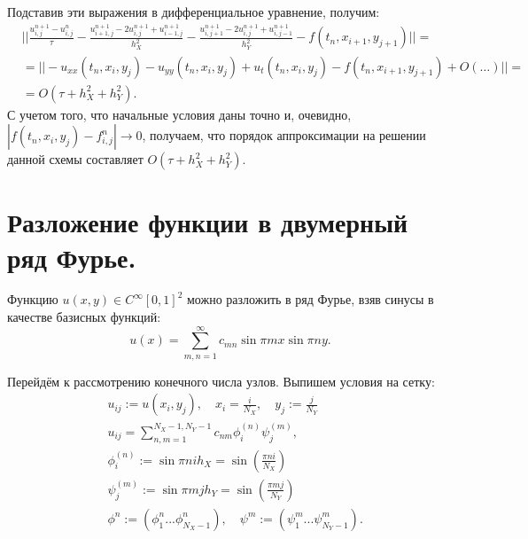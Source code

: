 \documentclass[14pt,a4paper]{extarticle}
\newcommand{\1}{\mathbbm{1}}
\begin{document}
Подставив эти выражения в дифференциальное уравнение, получим:
\begin{align*}
    &||\frac{u_{i, j}^{n+1} - u_{i, j}^n}{\tau} - \frac{u_{i+1, j}^{n+1} - 2 u_{i, j}^{n+1} + u_{i-1, j}^{n+1}}{h_X^2} - 
    \frac{u_{i, j+1}^{n+1} - 2 u_{i, j}^{n+1} + u_{i, j-1}^{n+1}}{h_Y^2} - f(t_{n}, x_{i+1}, y_{j+1})|| = \\
    &= ||- u_{xx}(t_n, x_{i}, y_j) - u_{yy}(t_n, x_{i}, y_j) + u_t(t_{n}, x_i, y_j) - f(t_{n}, x_{i+1}, y_{j+1}) + O(\ldots)||=\\ &=
     O(\tau + h_X^2 + h_Y^2).
\end{align*}
С учетом того, что начальные условия даны точно и, очевидно, $|f(t_n, x_i, y_j) - f_{i,j}^n| \rightarrow 0$, получаем, что порядок аппроксимации на решении 
данной схемы составляет $O(\tau + h_X^2 + h_Y^2)$.

\section{Разложение функции в двумерный ряд Фурье.}
Функцию $u(x, y) \in C^{\infty}[0, 1]^2$ можно разложить в ряд Фурье,
взяв синусы в качестве базисных функций:
\begin{equation*}
    u(x) = \sum_{m, n = 1}^{\infty} c_{mn} \sin {\pi m x} \sin {\pi n y}.
\end{equation*}
\par
Перейдём к рассмотрению конечного числа узлов. Выпишем условия на сетку:
\begin{align*}
     & u_{ij} := u(x_i, y_j), \quad x_i = \frac{i}{N_X}, \quad y_j := \frac{j}{N_Y}\\
     & u_{ij} = \sum_{n, m = 1}^{N_X-1, N_Y-1} c_{nm} \phi_i^{(n)} \psi_j^{(m)},                                    \\
     & \phi_i^{(n)} := \sin{\pi n i h_X} = \sin\left(\frac{\pi n i}{N_X}\right) \\
     & \psi_j^{(m)} := \sin{\pi m j h_Y} = \sin\left(\frac{\pi m j}{N_Y}\right) \\
     & \phi^n := (\phi_1^n ... \phi_{N_X-1}^n), \quad \psi^m := (\psi_1^m ... \psi_{N_Y-1}^m).
\end{align*}

\end{document}
